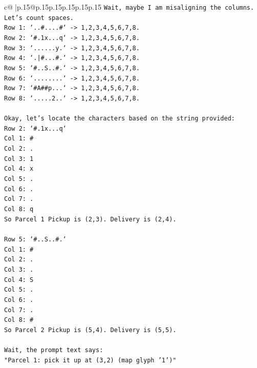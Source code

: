 \documentclass{article}
\begin{document}
{\begin{supertabular}{c@{$\;$}|p{.15\linewidth}@{}p{.15\linewidth}p{.15\linewidth}p{.15\linewidth}p{.15\linewidth}p{.15\linewidth}}
{{{\texttt{Wait, maybe I am misaligning the columns.} \\
\texttt{Let's count spaces.} \\
\texttt{Row 1: `..\#....\#` {-}> 1,2,3,4,5,6,7,8.} \\
\texttt{Row 2: `\#.1x...q` {-}> 1,2,3,4,5,6,7,8.} \\
\texttt{Row 3: `......y.` {-}> 1,2,3,4,5,6,7,8.} \\
\texttt{Row 4: `.|\#...\#.` {-}> 1,2,3,4,5,6,7,8.} \\
\texttt{Row 5: `\#..S..\#.` {-}> 1,2,3,4,5,6,7,8.} \\
\texttt{Row 6: `........` {-}> 1,2,3,4,5,6,7,8.} \\
\texttt{Row 7: `\#A\#\#p...` {-}> 1,2,3,4,5,6,7,8.} \\
\texttt{Row 8: `.....2..` {-}> 1,2,3,4,5,6,7,8.} \\
\\ 
\texttt{Okay, let's locate the characters based on the string provided:} \\
\texttt{Row 2: `\#.1x...q`} \\
\texttt{Col 1: \#} \\
\texttt{Col 2: .} \\
\texttt{Col 3: 1} \\
\texttt{Col 4: x} \\
\texttt{Col 5: .} \\
\texttt{Col 6: .} \\
\texttt{Col 7: .} \\
\texttt{Col 8: q} \\
\texttt{So Parcel 1 Pickup is (2,3). Delivery is (2,4).} \\
\\ 
\texttt{Row 5: `\#..S..\#.`} \\
\texttt{Col 1: \#} \\
\texttt{Col 2: .} \\
\texttt{Col 3: .} \\
\texttt{Col 4: S} \\
\texttt{Col 5: .} \\
\texttt{Col 6: .} \\
\texttt{Col 7: .} \\
\texttt{Col 8: \#} \\
\texttt{So Parcel 2 Pickup is (5,4). Delivery is (5,5).} \\
\\ 
\texttt{Wait, the prompt text says:} \\
\texttt{"Parcel 1: pick it up at (3,2) (map glyph '1')"} \\
}}}
\end{supertabular}}
\end{document}
